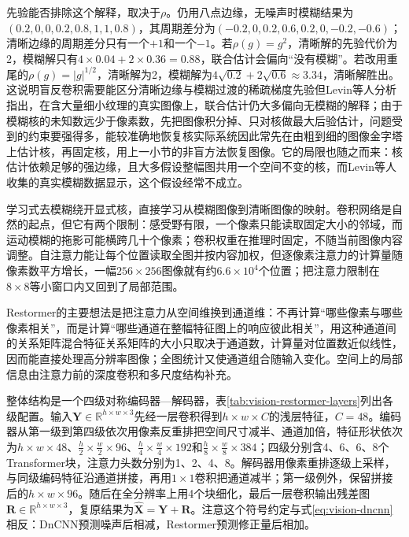 先验能否排除这个解释，取决于$\rho$。仍用八点边缘，无噪声时模糊结果为$(0.2,0,0,0.2,0.8,1,1,0.8)$，其周期差分为$(-0.2,0,0.2,0.6,0.2,0,-0.2,-0.6)$；清晰边缘的周期差分只有一个$+1$和一个$-1$。若$\rho(g)=g^2$，清晰解的先验代价为2，模糊解只有$4\times0.04+2\times0.36=0.88$，联合估计会偏向“没有模糊”。若改用重尾的$\rho(g)=|g|^{1/2}$，清晰解为2，模糊解为$4\sqrt{0.2}+2\sqrt{0.6}\approx3.34$，清晰解胜出。这说明盲反卷积需要能区分清晰边缘与模糊过渡的稀疏梯度先验但Levin等人分析指出，在含大量细小纹理的真实图像上，联合估计仍大多偏向无模糊的解释；由于模糊核的未知数远少于像素数，先把图像积分掉、只对核做最大后验估计，问题受到的约束要强得多，能较准确地恢复核实际系统因此常先在由粗到细的图像金字塔上估计核，再固定核，用上一小节的非盲方法恢复图像。它的局限也随之而来：核估计依赖足够的强边缘，且大多假设整幅图共用一个空间不变的核，而Levin等人收集的真实模糊数据显示，这个假设经常不成立。

学习式去模糊绕开显式核，直接学习从模糊图像到清晰图像的映射。卷积网络是自然的起点，但它有两个限制：感受野有限，一个像素只能读取固定大小的邻域，而运动模糊的拖影可能横跨几十个像素；卷积权重在推理时固定，不随当前图像内容调整。自注意力能让每个位置读取全图并按内容加权，但逐像素注意力的计算量随像素数平方增长，一幅$256\times256$图像就有约$6.6\times10^4$个位置；把注意力限制在$8\times8$等小窗口内又回到了局部范围。

Restormer的主要想法是把注意力从空间维换到通道维：不再计算“哪些像素与哪些像素相关”，而是计算“哪些通道在整幅特征图上的响应彼此相关”，用这种通道间的关系矩阵混合特征关系矩阵的大小只取决于通道数，计算量对位置数近似线性，因而能直接处理高分辨率图像；全图统计又使通道组合随输入变化。空间上的局部信息由注意力前的深度卷积和多尺度结构补充。

整体结构是一个四级对称编码器—解码器，表\ref{tab:vision-restormer-layers}列出各级配置。输入$\bm{Y}\in\mathbb{R}^{h\times w\times3}$先经一层卷积得到$h\times w\times C$的浅层特征，$C=48$。编码器从第一级到第四级依次用像素反重排把空间尺寸减半、通道加倍，特征形状依次为$h\times w\times48$、$\frac{h}{2}\times\frac{w}{2}\times96$、$\frac{h}{4}\times\frac{w}{4}\times192$和$\frac{h}{8}\times\frac{w}{8}\times384$；四级分别含4、6、6、8个Transformer块，注意力头数分别为1、2、4、8。解码器用像素重排逐级上采样，与同级编码特征沿通道拼接，再用$1\times1$卷积把通道减半；第一级例外，保留拼接后的$h\times w\times96$。随后在全分辨率上用4个块细化，最后一层卷积输出残差图$\bm{R}\in\mathbb{R}^{h\times w\times3}$，复原结果为$\widehat{\bm{X}}=\bm{Y}+\bm{R}$。注意这个符号约定与式\eqref{eq:vision-dncnn}相反：DnCNN预测噪声后相减，Restormer预测修正量后相加。

